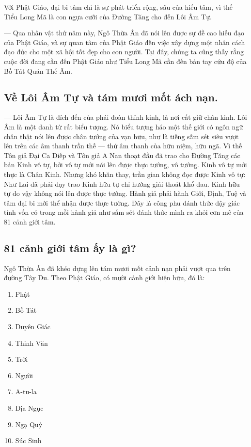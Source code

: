 Với Phật Giáo, đại bi tâm chỉ là sự phát triển rộng, sâu của hiếu tâm, vì thế Tiểu Long Mã là con ngựa cưỡi của Đường Tăng cho đến Lôi Âm Tự.

--- Qua nhân vật thứ năm này, Ngô Thừa Ân đã nói lên được sự đề cao hiếu đạo của Phật Giáo, và sự quan tâm của Phật Giáo đến việc xây dựng một nhân cách đạo đức cho một xã hội tốt đẹp cho con người. Tại đây, chúng ta cũng thấy rằng cuộc đời đang cần đến Phật Giáo như Tiểu Long Mã cần đến bàn tay cứu độ của Bồ Tát Quán Thế Âm.

\subsection{Về Lôi Âm Tự và tám mươi mốt ách nạn.} %
\label{sub:ve_loi_am_tu_va_tam_muoi_mot_ach_nan}

--- Lôi Âm Tự là đích đến của phái đoàn thỉnh kinh, là nơi cất giữ chân kinh. Lôi Âm là một danh từ rất biểu tượng. Nó biểu tượng háo một thế giới có ngôn ngữ chân thật nói lên được chân tướng của vạn hữu, như là tiếng sấm sét siêu vượt lên trên các âm thanh trần thế --- thứ âm thanh của hữu niệm, hữu ngã. Vì thế Tôn giả Đại Ca Diếp và Tôn giả A Nan thoạt đầu đã trao cho Đường Tăng các bản Kinh vô tự, bởi vô tự mới nói lên được thực tướng, vô tướng. Kinh vô tự mới thực là Chân Kinh. Nhưng khó khăn thay, trần gian không đọc được Kinh vô tự: Như Lai đã phải dạy trao Kinh hữu tự chỉ hướng giải thoát khổ đau. Kinh hữu tự do vậy không nói lên được thực tướng. Hành giả phải hành Giới, Định, Tuệ và tâm đại bi mới thể nhận được thực tướng. Đây là công phu đánh thức dậy giác tính vốn có trong mỗi hành giả như sấm sét đánh thức mình ra khỏi cơn mê của 81 cảnh giới tâm.

\subsection{81 cảnh giới tâm ấy là gì?} %
\label{sub:81_canh_gioi_tam}

Ngô Thừa Ân đã khéo dựng lên tám mươi mốt cảnh nạn phải vượt qua trên đường Tây Du. Theo Phật Giáo, có mười cảnh giới hiện hữu, đó là:

\begin{multicols}{2}
\begin{enumerate}[label=\itshape\arabic*\upshape/]
    \item Phật
    \item Bồ Tát
    \item Duyên Giác
    \item Thinh Văn
    \item Trời
    \item Người
    \item A-tu-la
    \item Địa Ngục
    \item Ngạ Quỷ
    \item Súc Sinh
\end{enumerate}
\end{multicols}

